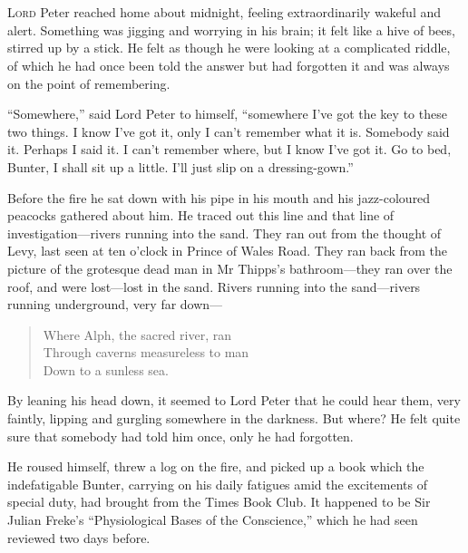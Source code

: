\chapter[Chapter \thechapter]{}
\lettrine[lines=4]{L}{ord} Peter reached home about midnight, feeling extraordinarily wakeful and alert. Something was jigging and worrying in his brain; it felt like a hive of bees, stirred up by a stick. He felt as though he were looking at a complicated riddle, of which he had once been told the answer but had forgotten it and was always on the point of remembering.

\enquote{Somewhere,} said Lord Peter to himself, \enquote{somewhere I’ve got the key to these two things. I know I’ve got it, only I can’t remember what it is. Somebody said it. Perhaps I said it. I can’t remember where, but I know I’ve got it. Go to bed, Bunter, I shall sit up a little. I’ll just slip on a dressing-gown.}

Before the fire he sat down with his pipe in his mouth and his jazz-coloured peacocks gathered about him. He traced out this line and that line of investigation\allowbreak---\allowbreak rivers running into the sand. They ran out from the thought of Levy, last seen at ten o’clock in Prince of Wales Road. They ran back from the picture of the grotesque dead man in Mr Thipps’s bathroom\allowbreak---\allowbreak they ran over the roof, and were lost\allowbreak---\allowbreak lost in the sand. Rivers running into the sand\allowbreak---\allowbreak rivers running underground, very far down---

\begin{verse}
Where Alph, the sacred river, ran\\
Through caverns measureless to man\\
Down to a sunless sea.\\
\end{verse}


By leaning his head down, it seemed to Lord Peter that he could hear them, very faintly, lipping and gurgling somewhere in the darkness. But where? He felt quite sure that somebody had told him once, only he had forgotten.

He roused himself, threw a log on the fire, and picked up a book which the indefatigable Bunter, carrying on his daily fatigues amid the excitements of special duty, had brought from the Times Book Club. It happened to be Sir Julian Freke’s \enquote{Physiological Bases of the Conscience,} which he had seen reviewed two days before.


